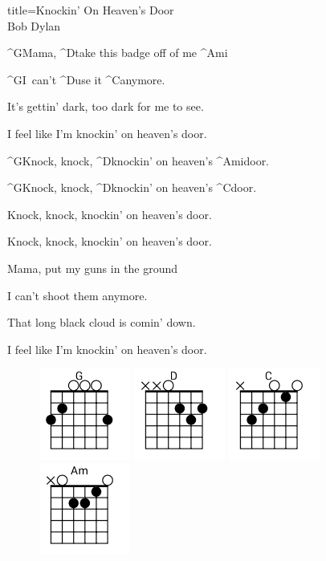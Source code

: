\begin{song}{title=\predtitle\centering Knockin' On Heaven's Door \\\large Bob Dylan  \vspace*{-0.3cm}}  %
\begin{centerjustified}
\nejnejvetsi

\sloka
	^{G}Mama, ^{D}take this badge off of me ^{Ami} 
 
	^{G\z}I~can't ^{D}use it ^{C}anymore. 
 
	It's gettin' dark, too dark for me to see.

	I feel like I'm knockin' on heaven's door.

	^{G}Knock, knock, ^{D}knockin' on heaven's  ^{Ami}door.

	^{G}Knock, knock, ^{D}knockin' on heaven's  ^{C}door. 
 
	Knock, knock, knockin' on heaven's door.

	Knock, knock, knockin' on heaven's door.

\sloka
	Mama, put my guns in the ground 

	I can't shoot them anymore. 

	That long black cloud is comin' down. 

	I feel like I'm knockin' on heaven's door. 


\end{centerjustified}
\setcounter{Slokočet}{0}
\end{song}
\begin{figure}[h]
\predtitle\centering
\includegraphics[width=3cm]{../Akordy/g.png}
\includegraphics[width=3cm]{../Akordy/d.png}
\includegraphics[width=3cm]{../Akordy/c.png}
\includegraphics[width=3cm]{../Akordy/am.png}
\end{figure}
